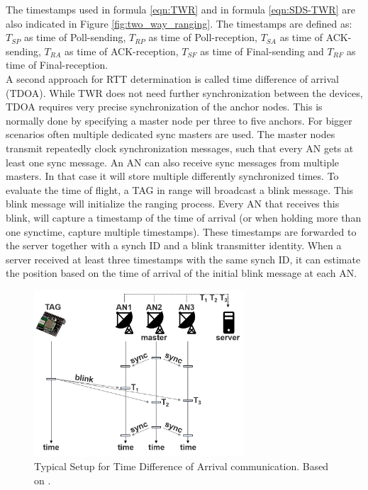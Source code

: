 The timestamps used in formula \ref{eqn:TWR} and in formula \ref{eqn:SDS-TWR} are also indicated in Figure \ref{fig:two_way_ranging}. The timestamps are defined as: $T_{SP}$ as time of Poll-sending, $T_{RP}$ as time of Poll-reception, $T_{SA}$ as time of ACK-sending, $T_{RA}$ as time of ACK-reception, $T_{SF}$ as time of Final-sending and $T_{RF}$ as time of Final-reception.\\
\noindent\hspace*{5mm}%
A second approach for RTT determination is called time difference of arrival (TDOA). While TWR does not need further synchronization between the devices, TDOA requires very precise synchronization of the anchor nodes. This is normally done by specifying a master node per three to five anchors. For bigger scenarios often multiple dedicated sync masters are used. The master nodes transmit repeatedly clock synchronization messages, such that every AN gets at least one sync message. An AN can also receive sync messages from multiple masters. In that case it will store multiple differently synchronized times.
To evaluate the time of flight, a TAG in range will broadcast a blink message. This blink message will initialize the ranging process. Every AN that receives this blink, will capture a timestamp of the time of arrival (or when holding more than one synctime, capture multiple timestamps). These timestamps are forwarded to the server together with a synch ID and a blink transmitter identity. When a server received at least three timestamps with the same synch ID, it can estimate the position based on the time of arrival of the initial blink message at each AN.
\begin{figure}[th]
\centering
\includegraphics[width=0.7\textwidth]{Figures/time_difference_of_arrival}
\decoRule
\caption[Time Difference of Arrival]{Typical Setup for Time Difference of Arrival communication. Based on \cite{SewioTDOA}.}
\label{fig:time_difference_of_arrival}
\end{figure}
